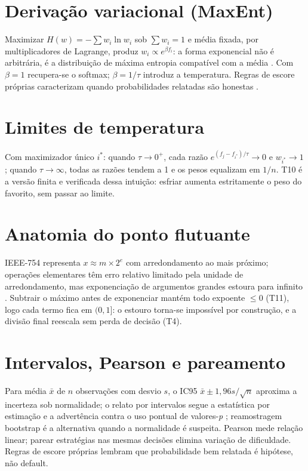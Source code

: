 \section{Derivação variacional (MaxEnt)}
Maximizar $H(w)=-\sum w_i\ln w_i$ sob $\sum w_i=1$ e média fixada, por multiplicadores de Lagrange, produz $w_i\propto e^{\beta f_i}$: a forma exponencial não é arbitrária, é a distribuição de máxima entropia compatível com a média \cite{jaynes1957,shannon1948}. Com $\beta=1$ recupera-se o softmax; $\beta=1/\tau$ introduz a temperatura. Regras de escore próprias caracterizam quando probabilidades relatadas são honestas \cite{gneiting2007}.
\section{Limites de temperatura}
Com maximizador único $i^*$: quando $\tau\to0^+$, cada razão $e^{(f_j-f_{i^*})/\tau}\to0$ e $w_{i^*}\to1$; quando $\tau\to\infty$, todas as razões tendem a 1 e os pesos equalizam em $1/n$. T10 é a versão finita e verificada dessa intuição: esfriar aumenta estritamente o peso do favorito, sem passar ao limite.
\section{Anatomia do ponto flutuante}
IEEE-754 representa $x\approx m\times2^e$ com arredondamento ao mais próximo; operações elementares têm erro relativo limitado pela unidade de arredondamento, mas exponenciação de argumentos grandes estoura para infinito \cite{goldberg1991,muller2018}. Subtrair o máximo antes de exponenciar mantém todo expoente $\leq0$ (T11), logo cada termo fica em $(0,1]$: o estouro torna-se impossível por construção, e a divisão final reescala sem perda de decisão (T4).
\section{Intervalos, Pearson e pareamento}
Para média $\bar{x}$ de $n$ observações com desvio $s$, o IC95 $\bar{x}\pm1{,}96s/\sqrt{n}$ aproxima a incerteza sob normalidade; o relato por intervalos segue a estatística por estimação \cite{cumming2014} e a advertência contra o uso pontual de valores-\textit{p} \cite{wasserstein2016}; reamostragem bootstrap \cite{efron1979} é a alternativa quando a normalidade é suspeita. Pearson mede relação linear; parear estratégias nas mesmas decisões elimina variação de dificuldade. Regras de escore próprias \cite{gneiting2007} lembram que probabilidade bem relatada é hipótese, não default.
